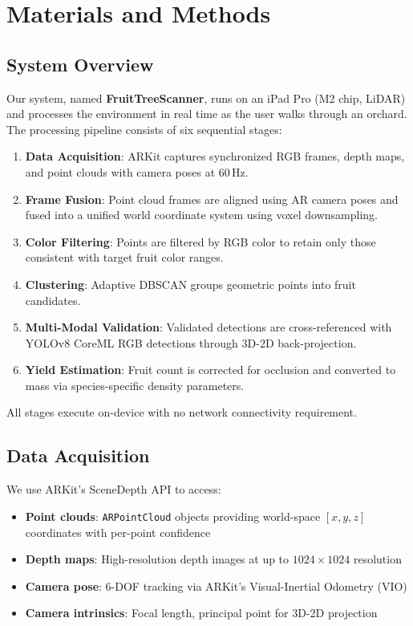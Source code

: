 \documentclass[12pt,a4paper]{article}
\begin{document}
\section{Materials and Methods}

\subsection{System Overview}

Our system, named \textbf{FruitTreeScanner}, runs on an iPad Pro (M2 chip, LiDAR) and processes the environment in real time as the user walks through an orchard. The processing pipeline consists of six sequential stages:

\begin{enumerate}
  \item \textbf{Data Acquisition}: ARKit captures synchronized RGB frames, depth maps, and point clouds with camera poses at 60\,Hz.
  \item \textbf{Frame Fusion}: Point cloud frames are aligned using AR camera poses and fused into a unified world coordinate system using voxel downsampling.
  \item \textbf{Color Filtering}: Points are filtered by RGB color to retain only those consistent with target fruit color ranges.
  \item \textbf{Clustering}: Adaptive DBSCAN groups geometric points into fruit candidates.
  \item \textbf{Multi-Modal Validation}: Validated detections are cross-referenced with YOLOv8 CoreML RGB detections through 3D-2D back-projection.
  \item \textbf{Yield Estimation}: Fruit count is corrected for occlusion and converted to mass via species-specific density parameters.
\end{enumerate}

All stages execute on-device with no network connectivity requirement.

\subsection{Data Acquisition}

We use ARKit's SceneDepth API to access:
\begin{itemize}
  \item \textbf{Point clouds}: \texttt{ARPointCloud} objects providing world-space $[x, y, z]$ coordinates with per-point confidence
  \item \textbf{Depth maps}: High-resolution depth images at up to $1024 \times 1024$ resolution
  \item \textbf{Camera pose}: 6-DOF tracking via ARKit's Visual-Inertial Odometry (VIO)
  \item \textbf{Camera intrinsics}: Focal length, principal point for 3D-2D projection
\end{itemize}
\end{document}
